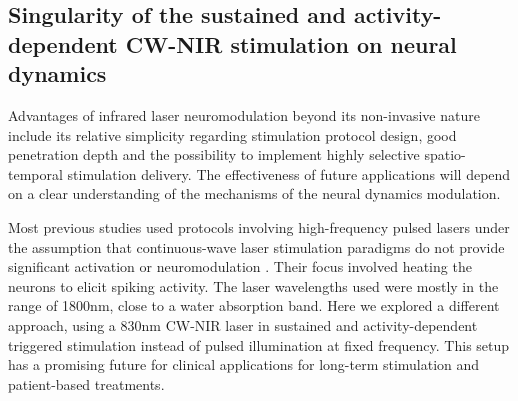 
\subsection{Singularity of the sustained and activity-dependent CW-NIR stimulation on neural dynamics}
Advantages of infrared laser neuromodulation beyond its non-invasive nature include its relative simplicity regarding stimulation protocol design, good penetration depth and the possibility to implement highly selective spatio-temporal stimulation delivery. The effectiveness of future applications will depend on a clear understanding of the mechanisms of the neural dynamics modulation.

Most previous studies used protocols involving high-frequency pulsed lasers under the assumption that continuous-wave laser stimulation paradigms do not provide significant activation or neuromodulation \parencite{wells_application_2005, wells_optical_2005, cayce_infrared_2014, chernov_infrared_2014, goyal_acute_2012, pan_infrared_2023}. Their focus involved heating the neurons to elicit spiking activity. The laser wavelengths used were mostly in the range of 1800nm, close to a water absorption band. Here we explored a different approach, using a 830nm CW-NIR laser in sustained and activity-dependent triggered stimulation instead of pulsed illumination at fixed frequency. This setup has a promising future for clinical applications for long-term stimulation and patient-based treatments.

